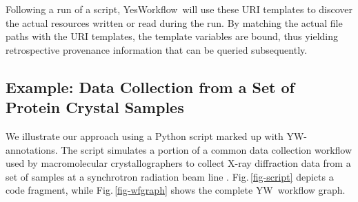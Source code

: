 \documentclass[letterpaper,twocolumn,10pt]{article}
\newcommand{\figref}[1]{Fig.\,\ref{#1}}
\newcommand{\YW}{\textsf{YesWorkflow}}
\newcommand{\yw}{\textsf{YW}}
\begin{document}


Following a run of a script, \YW\ will use these URI templates to
discover the actual resources written or read during the run.  By
matching the actual file paths with the URI templates, the template
variables are bound, thus yielding retrospective provenance
information that can be queried subsequently.





\subsection{Example: Data Collection from a Set of Protein Crystal
  Samples}
We illustrate our approach using a Python script marked up with
\yw-annotations.  The script simulates a portion of a common data
collection workflow used by macromolecular crystallographers to
collect X-ray diffraction data from a set of samples at a synchrotron
radiation beam line \protect\cite{tsai2013autodrug}.
\figref{fig-script} depicts a code fragment, while
\figref{fig-wfgraph} shows the complete \yw\ workflow graph.
\end{document}
